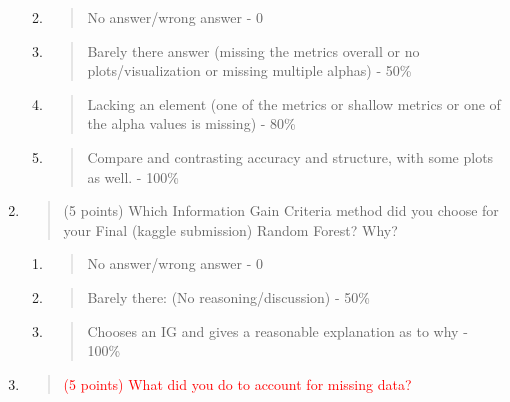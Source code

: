 \documentclass[
]{article}
\begin{document}
\begin{enumerate}
  \begin{enumerate}
  \def\labelenumii{\alph{enumii}.}
  \item
    \begin{quote}
    No answer/wrong answer - 0
    \end{quote}
  \item
    \begin{quote}
    Barely there answer (missing the metrics overall or no
    plots/visualization or missing multiple alphas) - 50\%
    \end{quote}
  \item
    \begin{quote}
    Lacking an element (one of the metrics or shallow metrics or one of
    the alpha values is missing) - 80\%
    \end{quote}
  \item
    \begin{quote}
    Compare and contrasting accuracy and structure, with some plots as
    well. - 100\%
    \end{quote}
  \end{enumerate}
\item
  \begin{quote}
  (5 points) Which Information Gain Criteria method did you choose for
  your Final (kaggle submission) Random Forest? Why?
  \end{quote}

  \begin{enumerate}
  \def\labelenumii{\alph{enumii}.}
  \item
    \begin{quote}
    No answer/wrong answer - 0
    \end{quote}
  \item
    \begin{quote}
    Barely there: (No reasoning/discussion) - 50\%
    \end{quote}
  \item
    \begin{quote}
    Chooses an IG and gives a reasonable explanation as to why - 100\%
    \end{quote}
  \end{enumerate}
\item
  \begin{quote}
  \textcolor{red}{(5 points) What did you do to account for missing data?}
  \end{quote}


\end{enumerate}
\end{document}
